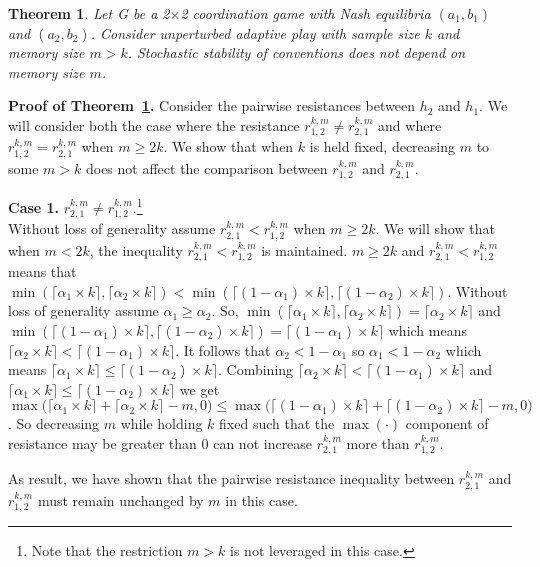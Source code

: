 \documentclass[11.5pt]{article}
\newtheorem{theorem}{Theorem}
\begin{document}
\begin{theorem}\label{Theorem_4}
Let G be a 2$\times$2 coordination game with Nash equilibria $(a_1,b_1)$ and $(a_2,b_2)$. 
Consider unperturbed adaptive play with sample size $k$ and memory size $m > k$. 
Stochastic stability of conventions does not depend on memory size $m$.
\end{theorem}

\textbf{Proof of Theorem~\ref{Theorem_4}.} 
Consider the pairwise resistances between $h_2$ and $h_1$. We will consider both the case where the resistance $r_{1,2}^{k,m} \neq r_{2,1}^{k,m}$ and where $r_{1,2}^{k,m} = r_{2,1}^{k,m}$ when $m \geq 2k$. We show that when $k$ is held fixed, decreasing $m$ to some $m>k$ does not affect the comparison between $r_{1,2}^{k,m}$ and $r_{2,1}^{k,m}$.

{\bf Case 1.} $r^{k,m}_{2,1} \neq r^{k,m}_{1,2}$.\footnote{Note that the restriction $m>k$ is not leveraged in this case.}  \\
Without loss of generality assume $r^{k,m}_{2,1} < r^{k,m}_{1,2}$ when $m \geq 2k$. We will show that when $m < 2k$, the inequality $r^{k,m}_{2,1} < r^{k,m}_{1,2}$ is maintained. $m \geq 2k$ and $r^{k,m}_{2,1} < r^{k,m}_{1,2}$ means that $\min(\lceil \alpha_1 \times k \rceil,\lceil \alpha_2 \times k \rceil) < \min(\lceil (1-\alpha_1) \times k \rceil,\lceil (1-\alpha_2) \times k \rceil)$. Without loss of generality assume $\alpha_1 \geq \alpha_2$. So, $\min(\lceil \alpha_1 \times k \rceil,\lceil \alpha_2 \times k \rceil) = \lceil \alpha_2 \times k \rceil$ and $\min(\lceil (1-\alpha_1) \times k \rceil,\lceil (1-\alpha_2) \times k \rceil) = \lceil (1-\alpha_1) \times k \rceil$ which means $\lceil \alpha_2 \times k \rceil < \lceil (1-\alpha_1) \times k \rceil$. It follows that $\alpha_2< 1- \alpha_1$ so $\alpha_1< 1 - \alpha_2$ which means $\lceil \alpha_1 \times k \rceil \leq \lceil (1 - \alpha_2) \times k \rceil$. Combining $\lceil \alpha_2 \times k \rceil < \lceil (1-\alpha_1) \times k \rceil$ and  $\lceil \alpha_1 \times k \rceil \leq \lceil (1 - \alpha_2) \times k \rceil$ we get $\max\big(\lceil \alpha_1 \times k \rceil+\lceil \alpha_2 \times k \rceil-m,0\big) \leq \max\big(\lceil (1-\alpha_1) \times k \rceil+\lceil (1-\alpha_2) \times k \rceil-m,0\big)$. 
So decreasing $m$ while holding $k$ fixed such that the $\max(\cdot)$ component of resistance may be greater than 0 can not increase $r^{k,m}_{2,1}$ more than $r^{k,m}_{1,2}$. 

As result, we have shown that the pairwise resistance inequality between $r^{k,m}_{2,1}$ and $r^{k,m}_{1,2}$ must remain unchanged by $m$ in this case.
\end{document}
